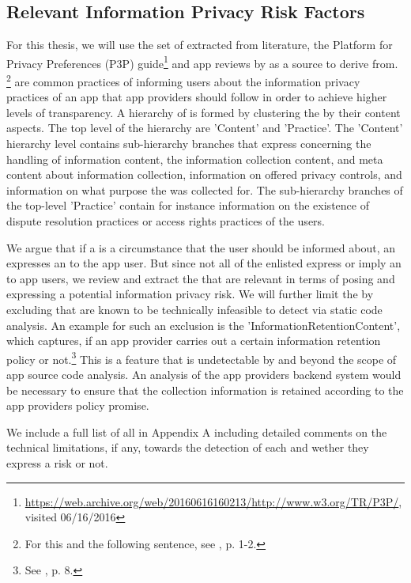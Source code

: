 \subsection{Relevant Information Privacy Risk Factors}\label{chapter:Relevant}


For this thesis, we will use the set of \ipp extracted from literature, the Platform for Privacy Preferences (\acs{P3P}) guide\footnote{\url{https://web.archive.org/web/20160616160213/http://www.w3.org/TR/P3P/}, visited 06/16/2016} and app reviews by \cite{Dehling2016} as a source to derive \iprfs from. \footnote{For this and the following sentence, see \cite{Dehling2016}, p. 1-2.} 
\Ipp are common practices of informing users about the information privacy practices of an app that app providers should follow in order to achieve higher levels of transparency.
A hierarchy of \ipp is formed by clustering the \ipp by their content aspects. 
The top level of the hierarchy are 'Content' and 'Practice'.
The 'Content' hierarchy level contains sub-hierarchy branches that express \ipp concerning the handling of information content, the information collection content, and meta content about information collection, information on offered privacy controls, and information on what purpose the \ipp was collected for.
The sub-hierarchy branches of the top-level 'Practice' contain for instance information on the existence of dispute resolution practices or access rights practices of the users.

We argue that if a \ipp is a circumstance that the user should be informed about, an \ipp expresses an \ipr to the app user.
But since not all of the enlisted \ipp express or imply an \ipr to app users, we review and extract the \ipp that are relevant in terms of posing and expressing a potential information privacy risk.
We will further limit the \ipp by excluding \ipp that are known to be technically infeasible to detect via static code analysis.
An example for such an exclusion is the \ipp 'InformationRetentionContent', which captures, if an app provider carries out a certain information retention policy or not.\footnote{See \cite{Dehling2016}, p. 8.}
This is a feature that is undetectable by \sca and beyond the scope of app source code analysis.
An analysis of the app providers backend system would be necessary to ensure that the collection information is retained according to the app providers policy promise.

We include a full list of all \ipp in Appendix A including detailed comments on the technical limitations, if any, towards the \sca detection of each \ipp and wether they express a risk or not.

